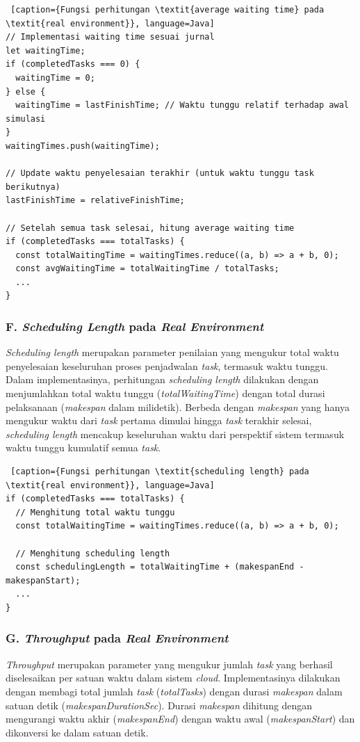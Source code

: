 \begin{lstlisting} [caption={Fungsi perhitungan \textit{average waiting time} pada \textit{real environment}}, language=Java]
// Implementasi waiting time sesuai jurnal
let waitingTime;
if (completedTasks === 0) {
  waitingTime = 0;
} else {
  waitingTime = lastFinishTime; // Waktu tunggu relatif terhadap awal simulasi
}
waitingTimes.push(waitingTime);

// Update waktu penyelesaian terakhir (untuk waktu tunggu task berikutnya)
lastFinishTime = relativeFinishTime;

// Setelah semua task selesai, hitung average waiting time
if (completedTasks === totalTasks) {
  const totalWaitingTime = waitingTimes.reduce((a, b) => a + b, 0);
  const avgWaitingTime = totalWaitingTime / totalTasks;
  ...
}
\end{lstlisting}

\subsubsection{F. \textit{Scheduling Length} pada \textit{Real Environment}}
\textit{Scheduling length} merupakan parameter penilaian yang mengukur total waktu penyelesaian keseluruhan proses penjadwalan \textit{task}, termasuk waktu tunggu. Dalam implementasinya, perhitungan \textit{scheduling length} dilakukan dengan menjumlahkan total waktu tunggu (\textit{totalWaitingTime}) dengan total durasi pelaksanaan (\textit{makespan} dalam milidetik). Berbeda dengan \textit{makespan} yang hanya mengukur waktu dari \textit{task} pertama dimulai hingga \textit{task} terakhir selesai, \textit{scheduling length} mencakup keseluruhan waktu dari perspektif sistem termasuk waktu tunggu kumulatif semua \textit{task}. 

\begin{lstlisting} [caption={Fungsi perhitungan \textit{scheduling length} pada \textit{real environment}}, language=Java]
if (completedTasks === totalTasks) {
  // Menghitung total waktu tunggu
  const totalWaitingTime = waitingTimes.reduce((a, b) => a + b, 0);
  
  // Menghitung scheduling length
  const schedulingLength = totalWaitingTime + (makespanEnd - makespanStart);
  ...
}
\end{lstlisting}

\subsubsection{G. \textit{Throughput} pada \textit{Real Environment}}
\textit{Throughput} merupakan parameter yang mengukur jumlah \textit{task} yang berhasil diselesaikan per satuan waktu dalam sistem \textit{cloud}. Implementasinya dilakukan dengan membagi total jumlah \textit{task} (\textit{totalTasks}) dengan durasi \textit{makespan} dalam satuan detik (\textit{makespanDurationSec}). Durasi \textit{makespan} dihitung dengan mengurangi waktu akhir (\textit{makespanEnd}) dengan waktu awal (\textit{makespanStart}) dan dikonversi ke dalam satuan detik.


